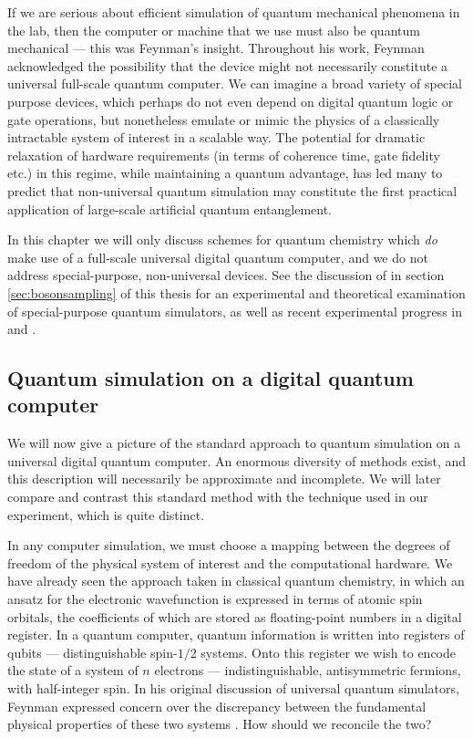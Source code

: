 If we are serious about efficient simulation of quantum mechanical phenomena in the lab, then the computer or machine that we use must also be quantum mechanical --- this was Feynman's insight. Throughout his work, Feynman acknowledged the possibility that the device might not necessarily constitute a universal full-scale quantum computer.  We can imagine a broad variety of special purpose devices, which perhaps do not even depend on digital quantum logic or gate operations, but nonetheless emulate or mimic the physics of a classically intractable system of interest in a scalable way. The potential for dramatic relaxation of hardware requirements (in terms of coherence time, gate fidelity etc.) in this regime, while maintaining a quantum advantage, has led many to predict that non-universal quantum simulation may constitute the first practical application of large-scale artificial quantum entanglement. 

In this chapter we will only discuss schemes for quantum chemistry which \emph{do} make use of a full-scale universal digital quantum computer, and we do not address special-purpose, non-universal devices. See the discussion of \bosonsampling in section \ref{sec:bosonsampling} of this thesis for an experimental and theoretical examination of special-purpose quantum simulators, as well as recent experimental progress in \cite{Britton2012} and \cite{Fukuhara2013}.

\subsection{Quantum simulation on a digital quantum computer}
We will now give a picture of the standard approach to quantum simulation on a universal digital quantum computer. An enormous diversity of methods exist, and this description will necessarily be approximate and incomplete. We will later compare and contrast this standard method with the technique used in our experiment, which is quite distinct.

In any computer simulation, we must choose a mapping between the degrees of freedom of the physical system of interest and the computational hardware. We have already seen the approach taken in classical quantum chemistry, in which an ansatz for the electronic wavefunction is expressed in terms of atomic spin orbitals, the coefficients of which are stored as floating-point numbers in a digital register. In a quantum computer, quantum information is written into registers of qubits --- distinguishable spin-$1/2$ systems. Onto this register we wish to encode the state of a system of $n$ electrons --- indistinguishable, antisymmetric fermions, with half-integer spin. In his original discussion of universal quantum simulators, Feynman expressed concern over the discrepancy between the fundamental physical properties of these two systems \cite{Feynman1982d}. How should we reconcile the two?

